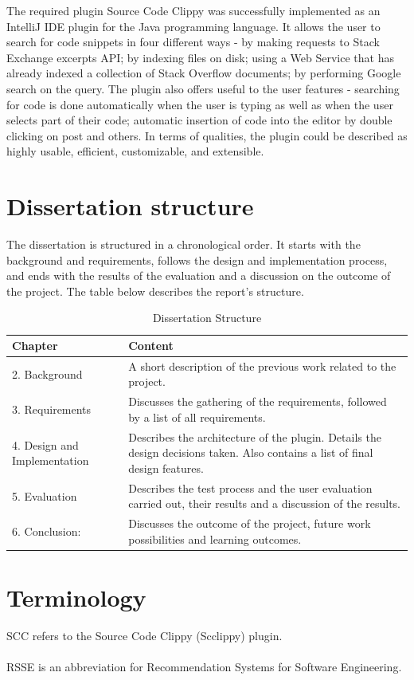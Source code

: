 \documentclass{l4proj}
\begin{document}
The required plugin Source Code Clippy was successfully implemented as an IntelliJ IDE plugin for the Java programming language. It allows the user to search for code snippets in four different ways - by making requests to Stack Exchange excerpts API; by indexing files on disk; using a Web Service that has already indexed a collection of Stack Overflow documents; by performing Google search on the query. The plugin also offers useful to the user features - searching for code is done automatically when the user is typing as well as when the user selects part of their code; automatic insertion of code into the editor by double clicking on post and others.  
In terms of qualities, the plugin could be described as highly usable, efficient, customizable, and extensible.

\section{Dissertation structure}
The dissertation is structured in a chronological order. It starts with the background and requirements, follows the design and implementation process, and ends with the results of the evaluation and a discussion on the outcome of the project. The table below describes the report's structure.

\begin{table}[H]
\caption{Dissertation Structure}
\centering
\def\arraystretch{1.5}
\begin{tabular}{p{3cm}p{12cm}}
\hline
Chapter & Content \\
\hline
2. Background & A short description of the previous work related to the project. \\
3. Requirements & Discusses the gathering of the requirements, followed by a list of all requirements. \\
4. Design and Implementation & Describes the architecture of the plugin. Details the design decisions taken. Also contains a list of final design features.\\
5. Evaluation & Describes the test process and the user evaluation carried out, their results and a discussion of the results. \\
6. Conclusion: & Discusses the outcome of the project, future work possibilities and learning outcomes.  \\
\hline
\end{tabular}
\label{table:reportStructure}
\end{table}


\section{Terminology}
SCC refers to the Source Code Clippy (Scclippy) plugin.
\\
\\
RSSE is an abbreviation for Recommendation Systems for Software Engineering.
\end{document}
